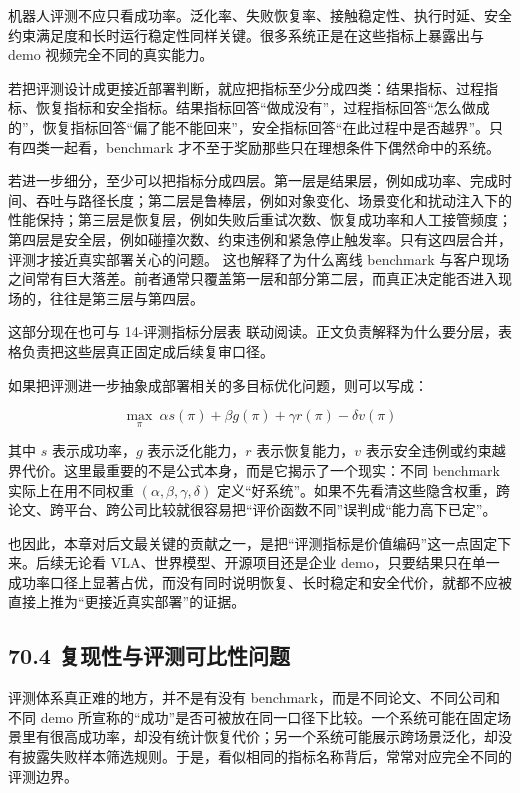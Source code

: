 机器人评测不应只看成功率。泛化率、失败恢复率、接触稳定性、执行时延、安全约束满足度和长时运行稳定性同样关键。很多系统正是在这些指标上暴露出与 demo 视频完全不同的真实能力。

若把评测设计成更接近部署判断，就应把指标至少分成四类：结果指标、过程指标、恢复指标和安全指标。结果指标回答“做成没有”，过程指标回答“怎么做成的”，恢复指标回答“偏了能不能回来”，安全指标回答“在此过程中是否越界”。只有四类一起看，benchmark 才不至于奖励那些只在理想条件下偶然命中的系统。

若进一步细分，至少可以把指标分成四层。第一层是结果层，例如成功率、完成时间、吞吐与路径长度；第二层是鲁棒层，例如对象变化、场景变化和扰动注入下的性能保持；第三层是恢复层，例如失败后重试次数、恢复成功率和人工接管频度；第四层是安全层，例如碰撞次数、约束违例和紧急停止触发率。只有这四层合并，评测才接近真实部署关心的问题。 这也解释了为什么离线 benchmark 与客户现场之间常有巨大落差。前者通常只覆盖第一层和部分第二层，而真正决定能否进入现场的，往往是第三层与第四层。

这部分现在也可与 14-评测指标分层表 联动阅读。正文负责解释为什么要分层，表格负责把这些层真正固定成后续复审口径。

如果把评测进一步抽象成部署相关的多目标优化问题，则可以写成：

\begingroup
\footnotesize
\begin{equation*}
\max_{\pi} \ \alpha s(\pi) + \beta g(\pi) + \gamma r(\pi) - \delta v(\pi)
\end{equation*}
\endgroup

其中 \(s\) 表示成功率，\(g\) 表示泛化能力，\(r\) 表示恢复能力，\(v\) 表示安全违例或约束越界代价。这里最重要的不是公式本身，而是它揭示了一个现实：不同 benchmark 实际上在用不同权重 \((\alpha,\beta,\gamma,\delta)\) 定义“好系统”。如果不先看清这些隐含权重，跨论文、跨平台、跨公司比较就很容易把“评价函数不同”误判成“能力高下已定”。

也因此，本章对后文最关键的贡献之一，是把“评测指标是价值编码”这一点固定下来。后续无论看 VLA、世界模型、开源项目还是企业 demo，只要结果只在单一成功率口径上显著占优，而没有同时说明恢复、长时稳定和安全代价，就都不应被直接上推为“更接近真实部署”的证据。

\subsection*{70.4 复现性与评测可比性问题}


评测体系真正难的地方，并不是有没有 benchmark，而是不同论文、不同公司和不同 demo 所宣称的“成功”是否可被放在同一口径下比较。一个系统可能在固定场景里有很高成功率，却没有统计恢复代价；另一个系统可能展示跨场景泛化，却没有披露失败样本筛选规则。于是，看似相同的指标名称背后，常常对应完全不同的评测边界。

